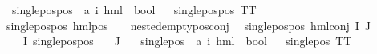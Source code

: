 \begin{isabellebody}
\isanewline
{}\isamarkupfalse%
\ single{\isacharunderscore}{\kern0pt}pos{\isacharunderscore}{\kern0pt}pos\ {\isacharcolon}{\kern0pt}{\isacharcolon}{\kern0pt}\ {\isachardoublequoteopen}{\isacharparenleft}{\kern0pt}{\isacharprime}{\kern0pt}a{\isacharcomma}{\kern0pt}\ {\isacharprime}{\kern0pt}i{\isacharparenright}{\kern0pt}\ hml\ {\isasymRightarrow}\ bool{\isachardoublequoteclose}\isanewline
\ \ \isanewline
{\isachardoublequoteopen}single{\isacharunderscore}{\kern0pt}pos{\isacharunderscore}{\kern0pt}pos\ TT{\isachardoublequoteclose}\ {\isacharbar}{\kern0pt}\isanewline
{\isachardoublequoteopen}single{\isacharunderscore}{\kern0pt}pos{\isacharunderscore}{\kern0pt}pos\ {\isacharparenleft}{\kern0pt}hml{\isacharunderscore}{\kern0pt}pos\ {\isacharunderscore}{\kern0pt}\ {\isasympsi}{\isacharparenright}{\kern0pt}{\isachardoublequoteclose}\ \ {\isachardoublequoteopen}nested{\isacharunderscore}{\kern0pt}empty{\isacharunderscore}{\kern0pt}pos{\isacharunderscore}{\kern0pt}conj\ {\isasympsi}{\isachardoublequoteclose}\ {\isacharbar}{\kern0pt}\isanewline
{\isachardoublequoteopen}single{\isacharunderscore}{\kern0pt}pos{\isacharunderscore}{\kern0pt}pos\ {\isacharparenleft}{\kern0pt}hml{\isacharunderscore}{\kern0pt}conj\ I\ J\ {\isasymPhi}{\isacharparenright}{\kern0pt}{\isachardoublequoteclose}\ \ \isanewline
{\isachardoublequoteopen}{\isacharparenleft}{\kern0pt}{\isasymforall}{\isasymphi}\ {\isasymin}\ {\isacharparenleft}{\kern0pt}{\isasymPhi}\ {\isacharbackquote}{\kern0pt}I{\isacharparenright}{\kern0pt}{\isachardot}{\kern0pt}\ {\isacharparenleft}{\kern0pt}single{\isacharunderscore}{\kern0pt}pos{\isacharunderscore}{\kern0pt}pos\ {\isasymphi}{\isacharparenright}{\kern0pt}{\isacharparenright}{\kern0pt}{\isachardoublequoteclose}\isanewline
{\isachardoublequoteopen}{\isacharparenleft}{\kern0pt}{\isasymPhi}\ {\isacharbackquote}{\kern0pt}\ J{\isacharparenright}{\kern0pt}\ {\isacharequal}{\kern0pt}\ {\isacharbraceleft}{\kern0pt}{\isacharbraceright}{\kern0pt}{\isachardoublequoteclose}\isanewline
\isanewline
{}\isamarkupfalse%
\ single{\isacharunderscore}{\kern0pt}pos\ {\isacharcolon}{\kern0pt}{\isacharcolon}{\kern0pt}\ {\isachardoublequoteopen}{\isacharparenleft}{\kern0pt}{\isacharprime}{\kern0pt}a{\isacharcomma}{\kern0pt}\ {\isacharprime}{\kern0pt}i{\isacharparenright}{\kern0pt}\ hml\ {\isasymRightarrow}\ bool{\isachardoublequoteclose}\isanewline
\ \ \isanewline
{\isachardoublequoteopen}single{\isacharunderscore}{\kern0pt}pos\ TT{\isachardoublequoteclose}\ {\isacharbar}{\kern0pt}\isanewline

\end{isabellebody}
